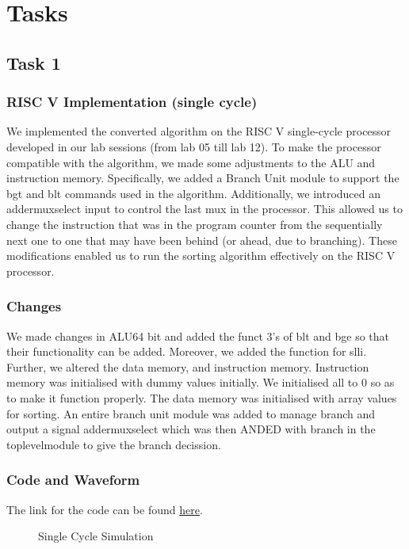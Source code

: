 \documentclass{report}
\begin{document}

\chapter{Tasks}
\section{Task 1}
\subsection{RISC V Implementation (single cycle)}

    We implemented the converted algorithm on the RISC V single-cycle processor developed in our lab sessions (from lab 05 till lab 12). To make the processor compatible with the algorithm, we made some adjustments to the ALU and instruction memory. Specifically, we added a Branch Unit module to support the bgt and blt commands used in the algorithm. Additionally, we introduced an addermuxselect input to control the last mux in the processor. This allowed us to change the instruction that was in the program counter from the sequentially next one to one that may have been behind (or ahead, due to branching). These modifications enabled us to run the sorting algorithm effectively on the RISC V processor.
    
\subsection{Changes}
    We made changes in ALU64 bit and added the funct 3's of blt and bge so that their functionality can be added. Moreover, we added the function for slli. Further, we altered the data memory, and instruction memory. Instruction memory was initialised with dummy values initially. We initialised all to 0 so as to make it function properly. The data memory was initialised with array values for sorting. An entire branch unit module was added to manage branch and output a signal addermuxselect which was then ANDED with branch in the toplevelmodule to give the branch decission.
    \pagebreak
\subsection{Code and Waveform}
The link for the code can be found \href{https://github.com/NehalNN10/CA-final-project/blob/main/final_project/final_project.srcs/sources_1/new/RISCV_Processor.v}{here}.
\begin{figure}[h]
    \centering
    \caption{Single Cycle Simulation}
    \label{fig: Single Cycle Simulation}
\end{figure}
\end{document}
